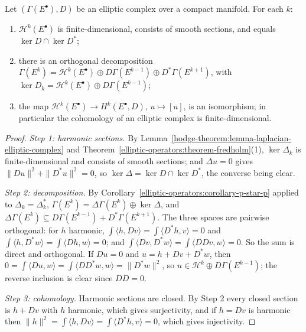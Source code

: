 \begin{theorem}\label{hodge-theorem:theorem-elliptic-complex}
Let $(\Gamma(E^\bullet), D)$ be an elliptic complex over a compact manifold. For each $k$:
\begin{enumerate}
\item $\mathcal{H}^k(E^\bullet)$ is finite-dimensional, consists of smooth sections, and equals $\ker D \cap \ker D^*$;
\item there is an orthogonal decomposition $\Gamma(E^k) = \mathcal{H}^k(E^\bullet) \oplus D\Gamma(E^{k-1}) \oplus D^*\Gamma(E^{k+1})$, with $\ker D_k = \mathcal{H}^k(E^\bullet) \oplus D\Gamma(E^{k-1})$;
\item the map $\mathcal{H}^k(E^\bullet) \to H^k(E^\bullet, D)$, $u \mapsto [u]$, is an isomorphism; in particular the cohomology of an elliptic complex is finite-dimensional.
\end{enumerate}
\end{theorem}

\begin{proof}
\emph{Step 1: harmonic sections.} By Lemma~\ref{hodge-theorem:lemma-laplacian-elliptic-complex} and Theorem~\ref{elliptic-operators:theorem-fredholm}(1), $\ker\Delta_k$ is finite-dimensional and consists of smooth
sections; and $\Delta u = 0$ gives $\|Du\|^2 + \|D^*u\|^2 = 0$, so $\ker\Delta = \ker D \cap \ker D^*$, the converse being clear.

\emph{Step 2: decomposition.} By Corollary~\ref{elliptic-operators:corollary-p-star-p} applied to $\Delta_k = \Delta_k^*$, $\Gamma(E^k) = \Delta\Gamma(E^k) \oplus \ker\Delta$, and
$\Delta\Gamma(E^k) \subseteq D\Gamma(E^{k-1}) + D^*\Gamma(E^{k+1})$. The three spaces are pairwise orthogonal: for $h$ harmonic, $\int\langle h, Dv\rangle = \int\langle D^*h, v\rangle = 0$ and
$\int\langle h, D^*w\rangle = \int\langle Dh, w\rangle = 0$; and $\int\langle Dv, D^*w\rangle = \int\langle DDv, w\rangle = 0$. So the sum is direct and orthogonal. If $Du = 0$ and $u = h + Dv + D^*w$, then
$0 = \int\langle Du, w\rangle = \int\langle DD^*w, w\rangle = \|D^*w\|^2$, so $u \in \mathcal{H}^k \oplus D\Gamma(E^{k-1})$; the reverse inclusion is clear since $DD = 0$.

\emph{Step 3: cohomology.} Harmonic sections are closed. By Step 2 every closed section is $h + Dv$ with $h$ harmonic, which gives surjectivity, and if $h = Dv$ is harmonic then
$\|h\|^2 = \int\langle h, Dv\rangle = \int\langle D^*h, v\rangle = 0$, which gives injectivity.
\end{proof}

